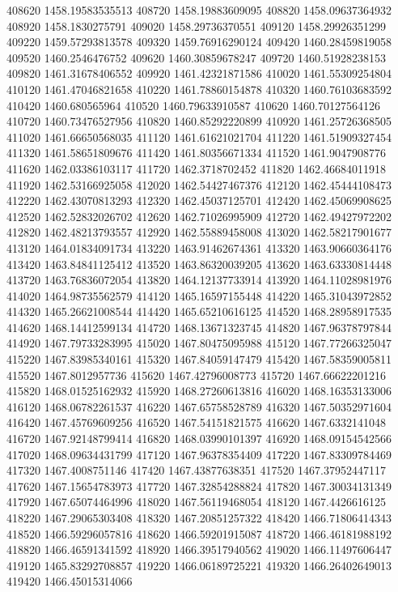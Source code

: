 {408620 1458.19583535513
408720 1458.19883609095
408820 1458.09637364932
408920 1458.1830275791
409020 1458.29736370551
409120 1458.29926351299
409220 1459.57293813578
409320 1459.76916290124
409420 1460.28459819058
409520 1460.2546476752
409620 1460.30859678247
409720 1460.51928238153
409820 1461.31678406552
409920 1461.42321871586
410020 1461.55309254804
410120 1461.47046821658
410220 1461.78860154878
410320 1460.76103683592
410420 1460.680565964
410520 1460.79633910587
410620 1460.70127564126
410720 1460.73476527956
410820 1460.85292220899
410920 1461.25726368505
411020 1461.66650568035
411120 1461.61621021704
411220 1461.51909327454
411320 1461.58651809676
411420 1461.80356671334
411520 1461.9047908776
411620 1462.03386103117
411720 1462.3718702452
411820 1462.46684011918
411920 1462.53166925058
412020 1462.54427467376
412120 1462.45444108473
412220 1462.43070813293
412320 1462.45037125701
412420 1462.45069908625
412520 1462.52832026702
412620 1462.71026995909
412720 1462.49427972202
412820 1462.48213793557
412920 1462.55889458008
413020 1462.58217901677
413120 1464.01834091734
413220 1463.91462674361
413320 1463.90660364176
413420 1463.84841125412
413520 1463.86320039205
413620 1463.63330814448
413720 1463.76836072054
413820 1464.12137733914
413920 1464.11028981976
414020 1464.98735562579
414120 1465.16597155448
414220 1465.31043972852
414320 1465.26621008544
414420 1465.65210616125
414520 1468.28958917535
414620 1468.14412599134
414720 1468.13671323745
414820 1467.96378797844
414920 1467.79733283995
415020 1467.80475095988
415120 1467.77266325047
415220 1467.83985340161
415320 1467.84059147479
415420 1467.58359005811
415520 1467.8012957736
415620 1467.42796008773
415720 1467.66622201216
415820 1468.01525162932
415920 1468.27260613816
416020 1468.16353133006
416120 1468.06782261537
416220 1467.65758528789
416320 1467.50352971604
416420 1467.45769609256
416520 1467.54151821575
416620 1467.6332141048
416720 1467.92148799414
416820 1468.03990101397
416920 1468.09154542566
417020 1468.09634431799
417120 1467.96378354409
417220 1467.83309784469
417320 1467.4008751146
417420 1467.43877638351
417520 1467.37952447117
417620 1467.15654783973
417720 1467.32854288824
417820 1467.30034131349
417920 1467.65074464996
418020 1467.56119468054
418120 1467.4426616125
418220 1467.29065303408
418320 1467.20851257322
418420 1466.71806414343
418520 1466.59296057816
418620 1466.59201915087
418720 1466.46181988192
418820 1466.46591341592
418920 1466.39517940562
419020 1466.11497606447
419120 1465.83292708857
419220 1466.06189725221
419320 1466.26402649013
419420 1466.45015314066
}
